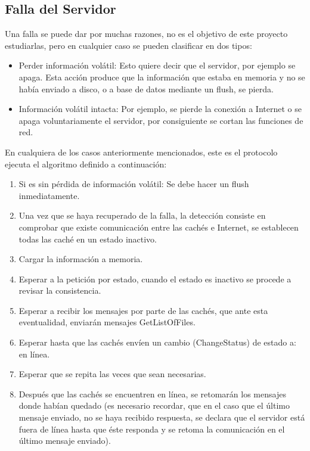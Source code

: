 \subsection{Falla del Servidor}
Una falla se puede dar por muchas razones, no es el objetivo de este proyecto estudiarlas, pero en cualquier caso se pueden clasificar en dos tipos:

\begin{itemize}
\item Perder información volátil: Esto quiere decir que el servidor, por ejemplo se apaga. Esta acción produce que la información que estaba en memoria y no se había enviado a disco, o a base de datos mediante un flush, se pierda.
\item Información volátil intacta: Por ejemplo, se pierde la conexión a Internet o se apaga voluntariamente el servidor, por consiguiente se cortan las funciones de red.
\end{itemize}

En cualquiera de los casos anteriormente mencionados, este es el protocolo ejecuta el algoritmo definido a continuación:

\begin{enumerate}
\item Si es sin pérdida de información volátil: Se debe hacer un flush inmediatamente.
\item Una vez que se haya recuperado de la falla, la detección consiste en comprobar que existe comunicación entre las cachés e Internet, se establecen todas las caché en un estado inactivo.
\item Cargar la información a memoria.
\item Esperar a la petición por estado, cuando el estado es inactivo se procede a revisar la consistencia.
\item Esperar a recibir los mensajes por parte de las cachés, que ante esta eventualidad, enviarán mensajes GetListOfFiles.
\item Esperar hasta que las cachés envíen un cambio (ChangeStatus) de estado a: en línea.
\item Esperar que se repita las veces que sean necesarias.
\item Después que las cachés se encuentren en línea, se retomarán los mensajes donde habían quedado (es necesario recordar, que en el caso que el último mensaje enviado, no se haya recibido respuesta, se declara que el servidor está fuera de línea hasta que éste responda y se retoma la comunicación en el último mensaje enviado).
\end{enumerate}

